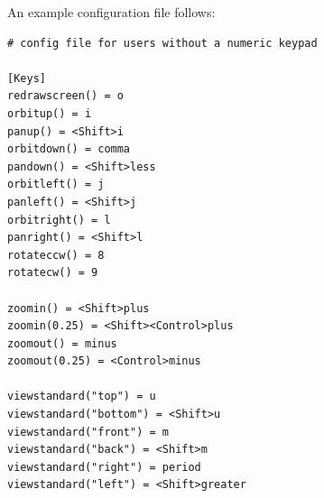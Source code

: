 \documentclass[12pt]{report}
\begin{document}
An example configuration file follows:

\begin{verbatim}
# config file for users without a numeric keypad

[Keys]
redrawscreen() = o
orbitup() = i
panup() = <Shift>i
orbitdown() = comma
pandown() = <Shift>less
orbitleft() = j
panleft() = <Shift>j
orbitright() = l
panright() = <Shift>l
rotateccw() = 8
rotatecw() = 9

zoomin() = <Shift>plus
zoomin(0.25) = <Shift><Control>plus
zoomout() = minus
zoomout(0.25) = <Control>minus

viewstandard("top") = u
viewstandard("bottom") = <Shift>u
viewstandard("front") = m
viewstandard("back") = <Shift>m
viewstandard("right") = period
viewstandard("left") = <Shift>greater
\end{verbatim}
\end{document}
